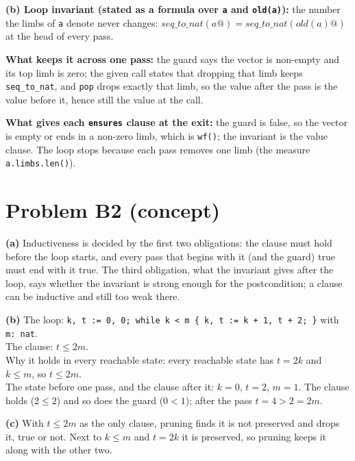 \documentclass[11pt]{article}
\begin{document}
\begin{answer}
\textbf{(b) Loop invariant (stated as a formula over \texttt{a} and
\texttt{old(a)}):} the number the limbs of \texttt{a} denote never changes:
$\mathit{seq\_to\_nat}(a@) = \mathit{seq\_to\_nat}(\mathit{old}(a)@)$ at the
head of every pass.

\textbf{What keeps it across one pass:} the guard says the vector is non-empty
and its top limb is zero; the given call states that dropping that limb keeps
\texttt{seq\_to\_nat}, and \texttt{pop} drops exactly that limb, so the value
after the pass is the value before it, hence still the value at the call.

\textbf{What gives each \texttt{ensures} clause at the exit:} the guard is
false, so the vector is empty or ends in a non-zero limb, which is
\texttt{wf()}; the invariant is the value clause. The loop stops because each
pass removes one limb (the measure \texttt{a.limbs.len()}).
\end{answer}

\section*{Problem B2 (concept)}\label{ans:B2}
\begin{answer}
\textbf{(a)} Inductiveness is decided by the first two obligations: the clause
must hold before the loop starts, and every pass that begins with it (and the
guard) true must end with it true. The third obligation, what the invariant
gives after the loop, says whether the invariant is strong enough for the
postcondition; a clause can be inductive and still too weak there.

\textbf{(b)} The loop: \texttt{k, t := 0, 0; while k < m \{ k, t := k + 1, t + 2; \}}
with \texttt{m: nat}. \\
The clause: $t \leq 2m$. \\
Why it holds in every reachable state: every reachable state has $t = 2k$ and
$k \leq m$, so $t \leq 2m$. \\
The state before one pass, and the clause after it: $k = 0$, $t = 2$, $m = 1$.
The clause holds ($2 \leq 2$) and so does the guard ($0 < 1$); after the pass
$t = 4 > 2 = 2m$.

\textbf{(c)} With $t \leq 2m$ as the only clause, pruning finds it is not
preserved and drops it, true or not. Next to $k \leq m$ and $t = 2k$ it is
preserved, so pruning keeps it along with the other two.
\end{answer}
\end{document}
